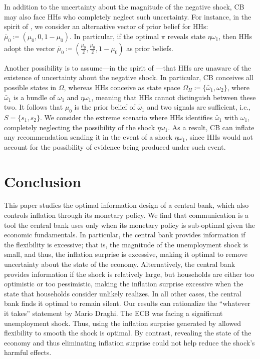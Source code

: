 \documentclass[12pt,a4paper]{article}
\begin{document}
In addition to the uncertainty about the magnitude of the negative shock, CB may also face HHs who completely neglect such uncertainty. For instance, in the spirit of \cite{galperti2019persuasion}, we consider an alternative vector of prior belief for HHs: $\bar{\mu}_0\coloneqq\left(\mu_0,0,1-\mu_0\right)$. In particular, if the optimal $\pi$ reveals state $\eta \omega_1$, then HHs adopt the vector $\bar{\mu}_0\coloneqq\left(\frac{\mu_0}{2},\frac{\mu_0}{2},1-\mu_0\right)$ as prior beliefs.

Another possibility is to assume---in the spirit of \cite{evsyukova2024information}---that HHs are unaware of the existence of uncertainty about the negative shock. In particular, CB conceives all possible states in $\Omega$, whereas HHs conceive as state space $\Omega_{H}\coloneqq\{\bar{\omega}_1,\omega_2\}$, where $\bar{\omega}_1$ is a bundle of $\omega_1$ and $\eta\omega_1$, meaning that HHs cannot distinguish between these two. It follows that $\mu_0$ is the prior belief of $\bar{\omega}_1$ and two signals are sufficient, i.e., $S=\{s_1,s_2\}$. We consider the extreme scenario where HHs identifies $\bar{\omega}_1$ with $\omega_1$, completely neglecting the possibility of the shock $\eta \omega_1$. As a result, CB can inflate any recommendation sending it in the event of a shock $\eta \omega_1$, since HHs would not account for the possibility of evidence being produced under such event.



\section{Conclusion}

This paper studies the optimal information design of a central bank, which also controls inflation through its monetary policy.
We find that communication is a tool the central bank uses only when its monetary policy is sub-optimal given the economic fundamentals. In particular, the central bank provides information if the flexibility is excessive; that is, the magnitude of the unemployment shock is small, and thus, the inflation surprise is excessive, making it optimal to remove uncertainty about the state of the economy. Alternatively, the central bank provides information if the shock is relatively large, but households are either too optimistic or too pessimistic, making the inflation surprise excessive when the state that households consider unlikely realizes. In all other cases, the central bank finds it optimal to remain silent. Our results can rationalize the ``whatever it takes'' statement by Mario Draghi. The ECB was facing a significant unemployment shock. Thus, using the inflation surprise generated by allowed flexibility to smooth the shock is optimal. By contrast, revealing the state of the economy and thus eliminating inflation surprise could not help reduce the shock's harmful effects.
\end{document}
